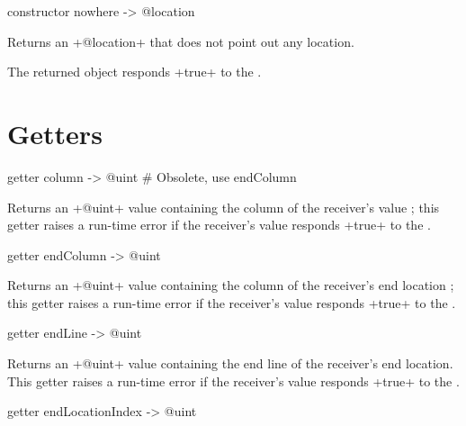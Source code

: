 
\begin{galgas}
constructor nowhere -> @location
\end{galgas}


Returns an \ggs+@location+ that does not point out any location.

The returned object responds \ggs+true+ to the .





\section{Getters}



\begin{galgas}
getter column -> @uint # Obsolete, use endColumn
\end{galgas}

Returns an \ggs+@uint+ value containing the column of the receiver's value ; this getter raises a run-time error if the receiver's value responds \ggs+true+ to the .


\begin{galgas}
getter endColumn -> @uint
\end{galgas}

Returns an \ggs+@uint+ value containing the column of the receiver's end location ; this getter raises a run-time error if the receiver's value responds \ggs+true+ to the .



\begin{galgas}
getter endLine -> @uint
\end{galgas}

Returns an \ggs+@uint+ value containing the end line of the receiver's end location. This getter raises a run-time error if the receiver's value responds \ggs+true+ to the .



\begin{galgas}
getter endLocationIndex -> @uint
\end{galgas}

